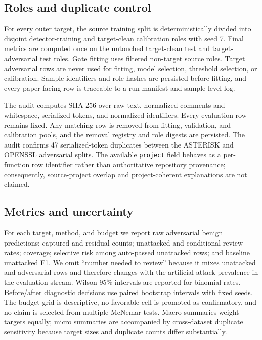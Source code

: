 \documentclass[a4paper,fleqn]{cas-dc}
\newcommand{\dataset}[1]{\textsc{#1}}
\begin{document}
\subsection{Roles and duplicate control}

For every outer target, the source training split is deterministically divided into disjoint detector-training and target-clean calibration roles with seed 7. Final metrics are computed once on the untouched target-clean test and target-adversarial test roles. Gate fitting uses filtered non-target source roles. Target adversarial rows are never used for fitting, model selection, threshold selection, or calibration. Sample identifiers and role hashes are persisted before fitting, and every paper-facing row is traceable to a run manifest and sample-level log.

The audit computes SHA-256 over raw text, normalized comments and whitespace, serialized tokens, and normalized identifiers. Every evaluation row remains fixed. Any matching row is removed from fitting, validation, and calibration pools, and the removal registry and role digests are persisted. The audit confirms 47 serialized-token duplicates between the \dataset{ASTERISK} and \dataset{OPENSSL} adversarial splits. The available \texttt{project} field behaves as a per-function row identifier rather than authoritative repository provenance; consequently, source-project overlap and project-coherent explanations are not claimed.


\subsection{Metrics and uncertainty}

For each target, method, and budget we report raw adversarial benign predictions; captured and residual counts; unattacked and conditional review rates; coverage; selective risk among auto-passed unattacked rows; and baseline unattacked F1. We omit ``number needed to review'' because it mixes unattacked and adversarial rows and therefore changes with the artificial attack prevalence in the evaluation stream. Wilson 95\% intervals are reported for binomial rates. Before/after diagnostic decisions use paired bootstrap intervals with fixed seeds. The budget grid is descriptive, no favorable cell is promoted as confirmatory, and no claim is selected from multiple McNemar tests. Macro summaries weight targets equally; micro summaries are accompanied by cross-dataset duplicate sensitivity because target sizes and duplicate counts differ substantially.
\end{document}
